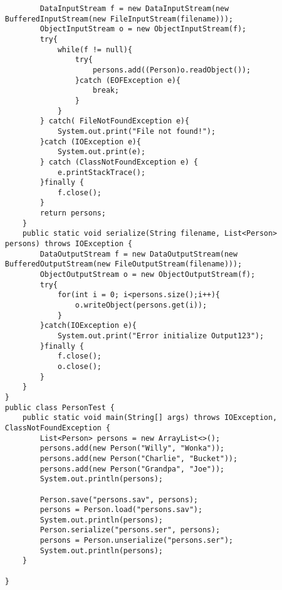 \documentclass[12pt,a4paper,oneside,ngerman]{article}
\begin{document}
\begin{lstlisting}
		DataInputStream f = new DataInputStream(new BufferedInputStream(new FileInputStream(filename)));
		ObjectInputStream o = new ObjectInputStream(f);
		try{
			while(f != null){
				try{
					persons.add((Person)o.readObject());
				}catch (EOFException e){
					break;
				}
			}
		} catch( FileNotFoundException e){
			System.out.print("File not found!");
		}catch (IOException e){
			System.out.print(e);
		} catch (ClassNotFoundException e) {
			e.printStackTrace();
		}finally {
			f.close();
		}
		return persons;
	}
	public static void serialize(String filename, List<Person> persons) throws IOException {
		DataOutputStream f = new DataOutputStream(new BufferedOutputStream(new FileOutputStream(filename)));
		ObjectOutputStream o = new ObjectOutputStream(f);
		try{
			for(int i = 0; i<persons.size();i++){
				o.writeObject(persons.get(i));
			}
		}catch(IOException e){
			System.out.print("Error initialize Output123");
		}finally {
			f.close();
			o.close();
		}
	}
}
public class PersonTest {
	public static void main(String[] args) throws IOException, ClassNotFoundException {
		List<Person> persons = new ArrayList<>();
		persons.add(new Person("Willy", "Wonka"));
		persons.add(new Person("Charlie", "Bucket"));
		persons.add(new Person("Grandpa", "Joe"));
		System.out.println(persons);
		
		Person.save("persons.sav", persons);
		persons = Person.load("persons.sav");
		System.out.println(persons);
		Person.serialize("persons.ser", persons);
		persons = Person.unserialize("persons.ser");
		System.out.println(persons);
	}

}
\end{lstlisting}
\end{document}
